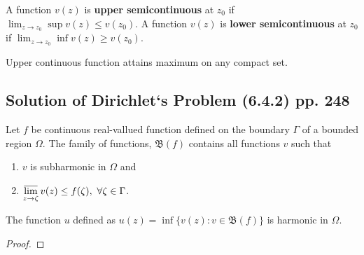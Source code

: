 \begin{definition}[semicontinuous]
	A function $v(z)$ is \textbf{upper semicontinuous} at $z_0$ if $\displaystyle \lim_{z \to z_0} \sup v(z) \le v(z_0)$.
	A function $v(z)$ is \textbf{lower semicontinuous} at $z_0$ if $\displaystyle \lim_{z \to z_0} \inf v(z) \ge v(z_0)$.
\end{definition}

\begin{remark}
	Upper continuous function attains maximum on any compact set.
\end{remark}

\subsection{Solution of Dirichlet`s Problem (6.4.2) pp. 248}
\begin{definition}[$\mathfrak{B}(f)$]
	Let $f$ be continuous real-vallued function defined on the boundary $\Gamma$ of a bounded region $\Omega$.
	The family of functions, $\mathfrak{B}(f)$ contains all functions $v$ such that 
	\begin{enumerate}
		\item $v$ is subharmonic in $\Omega$ and
		\item $\displaystyle \varlimsup_{z \to \zeta} v(z) \le f(\zeta),\ \forall \zeta \in \Gamma$.
	\end{enumerate}
\end{definition}
\begin{lemma}
	The function $u$ defined as $u(z) = \inf \{ v(z) : v \in \mathfrak{B}(f)\}$ is harmonic in $\Omega$.
\end{lemma}
\begin{proof}
\end{proof}

